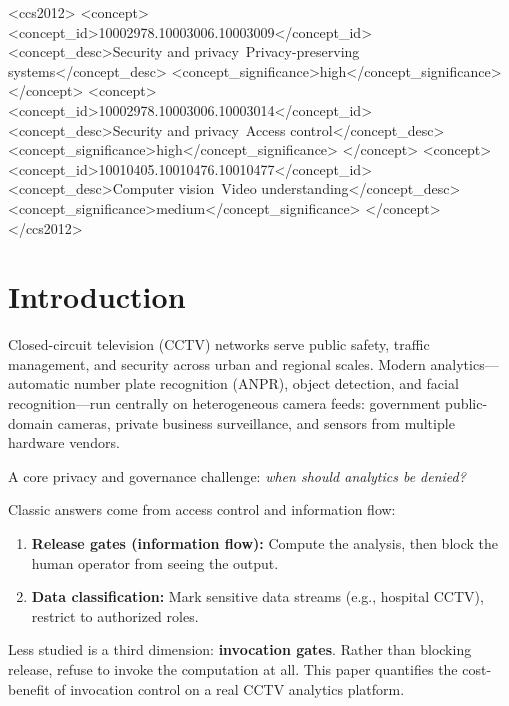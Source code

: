 \documentclass[sigplan,review]{acmart}
\begin{document}
\begin{CCSXML}
<ccs2012>
  <concept>
    <concept_id>10002978.10003006.10003009</concept_id>
    <concept_desc>Security and privacy~Privacy-preserving systems</concept_desc>
    <concept_significance>high</concept_significance>
  </concept>
  <concept>
    <concept_id>10002978.10003006.10003014</concept_id>
    <concept_desc>Security and privacy~Access control</concept_desc>
    <concept_significance>high</concept_significance>
  </concept>
  <concept>
    <concept_id>10010405.10010476.10010477</concept_id>
    <concept_desc>Computer vision~Video understanding</concept_desc>
    <concept_significance>medium</concept_significance>
  </concept>
</ccs2012>
\end{CCSXML}


\maketitle

\section{Introduction}

Closed-circuit television (CCTV) networks serve public safety, traffic management, and security
across urban and regional scales. Modern analytics—automatic number plate recognition (ANPR),
object detection, and facial recognition—run centrally on heterogeneous camera feeds:
government public-domain cameras, private business surveillance, and sensors from multiple
hardware vendors.

A core privacy and governance challenge: \emph{when should analytics be denied?}

Classic answers come from access control and information flow:
\begin{enumerate}
  \item \textbf{Release gates (information flow):} Compute the analysis, then block the human operator from seeing the output.
  \item \textbf{Data classification:} Mark sensitive data streams (e.g., hospital CCTV), restrict to authorized roles.
\end{enumerate}

Less studied is a third dimension: \textbf{invocation gates}. Rather than blocking release, refuse to invoke
the computation at all. This paper quantifies the cost-benefit of invocation control on a real CCTV analytics
platform.
\end{document}
